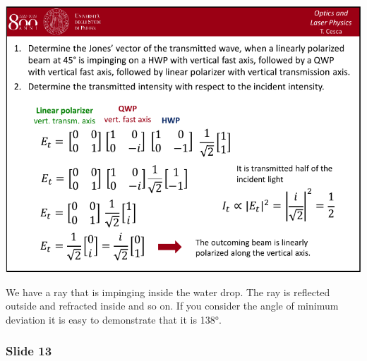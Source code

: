\documentclass[../main/main.tex]{subfiles}
\begin{document}
\begin{minipage}[]{0.5\linewidth}
\centering
\includegraphics[page=12,width=1\textwidth]{../lessons/pdf_file/04_lecture.pdf}
\end{minipage}
\hspace{0.3cm}\vspace{0.3cm}
\begin{minipage}[c]{0.47\linewidth}

We have a ray that is impinging inside the water drop. The ray is reflected outside and refracted inside and so on. If you consider the angle of minimum deviation it is easy to demonstrate that it is 138°.

\end{minipage}

\subsubsection*{Slide 13}
\end{document}
